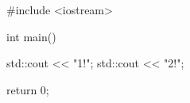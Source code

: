 \begin{console}
#include <iostream>

int main()
{
    std::cout << "1!\n";
    std::cout << "2!\n";

    return 0;
}
\end{console}
